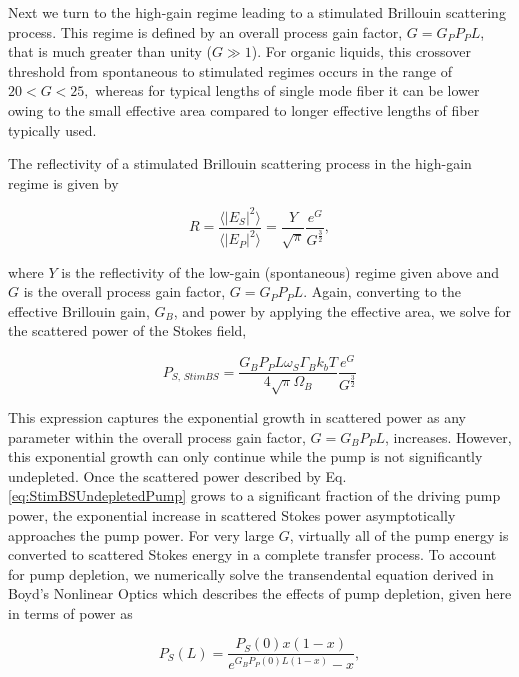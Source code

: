 Next we turn to the high-gain regime leading to a stimulated Brillouin scattering process. This regime is defined by an overall process gain factor, $G = G_{P}P_{P}L$, that is much greater than unity ($G \gg 1$). For organic liquids, this crossover threshold from spontaneous to stimulated regimes occurs in the range of $20 < G < 25,$\cite{boyd1990noise} whereas for typical lengths of single mode fiber it can be lower\cite{ippen1972stimulated} owing to the small effective area compared to longer effective lengths of fiber typically used.

The reflectivity of a stimulated Brillouin scattering process in the high-gain regime is given by \cite{boyd1990noise}

\begin{equation}
  R = \frac{\langle|E_{S}|^{2}\rangle}{\langle|E_{P}|^{2}\rangle} = \frac{Y}{\sqrt{\pi}}\frac{e^{G}}{G^{\frac{3}{2}}},
\end{equation}

where $Y$ is the reflectivity of the low-gain (spontaneous) regime given above and $G$ is the overall process gain factor, $G = G_{P}P_{P}L$. Again, converting to the effective Brillouin gain, $G_{B}$, and power by applying the effective area, we solve for the scattered power of the Stokes field,

\begin{equation}
  P_{S, \,\textit{StimBS}} = \frac{G_{B}P_{P}L\omega_{S}\Gamma_{B}k_{b}T}{4\sqrt{\pi}\Omega_{B}}\frac{e^{G}}{G^{\frac{3}{2}}}
  \label{eq:StimBSUndepletedPump}
\end{equation}

This expression captures the exponential growth in scattered power as any parameter within the overall process gain factor, $G = G_{B}P_{P}L$, increases. However, this exponential growth can only continue while the pump is not significantly undepleted. Once the scattered power described by Eq. \ref{eq:StimBSUndepletedPump} grows to a significant fraction of the driving pump power, the exponential increase in scattered Stokes power asymptotically approaches the pump power. For very large $G$, virtually all of the pump energy is converted to scattered Stokes energy in a complete transfer process.\cite{boyd2020nonlinear} To account for pump depletion, we numerically solve the transendental equation derived in Boyd's Nonlinear Optics which describes the effects of pump depletion, given here in terms of power as

\begin{equation}
  P_S(L) = \frac{P_S(0)x(1 - x)}{e^{G_{B}P_{P}(0)L(1 - x)} - x},
\end{equation}

